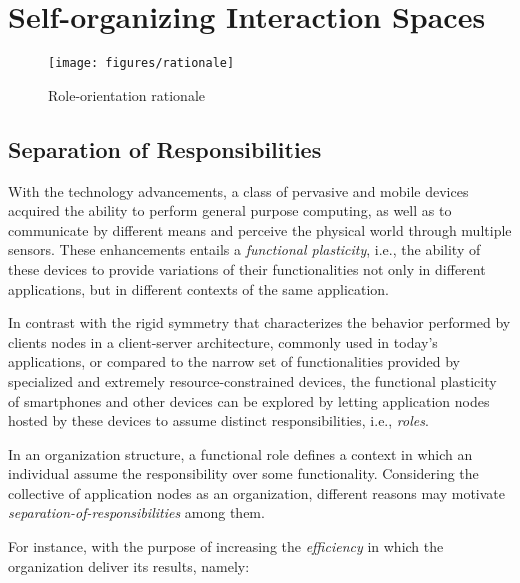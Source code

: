 \section{Self-organizing Interaction Spaces}\label{sec:edge_spaces}

\begin{figure*}[t!]
	\centering
	\texttt{[image: figures/rationale]}
	\caption{Role-orientation rationale}
	\label{fig:rationale}
\end{figure*}

\subsection{Separation of Responsibilities}


With the technology advancements, a class of pervasive and mobile devices acquired the ability to perform general purpose computing, as well as to communicate by different means and perceive the physical world through multiple sensors. These enhancements entails a \textit{functional plasticity}, i.e., the ability of these devices to provide variations of their functionalities not only in different applications, but in different contexts of the same application. 

In contrast with the rigid symmetry that characterizes the behavior performed by clients nodes in a client-server architecture, commonly used in today's applications, or compared to the narrow set of functionalities provided by specialized and extremely resource-constrained devices, the functional plasticity of smartphones and other devices can be explored by letting application nodes hosted by these devices to assume distinct responsibilities, i.e., \textit{roles}.

In an organization structure, a functional role defines a context in which an individual assume the responsibility over some functionality. 
Considering the collective of application nodes as an organization, different reasons may motivate \textit{separation-of-responsibilities} among them. 

For instance, with the purpose of increasing the \textit{efficiency} in which the organization deliver its results, namely:
	
